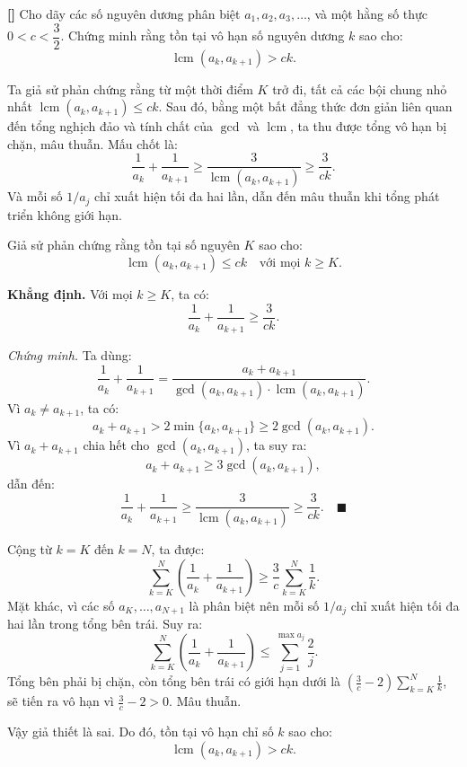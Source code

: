 \documentclass[../01-divisibility.tex]{subfiles}
\begin{document}
\begin{example*}\label{example:CHN-2015-TST1-D1-P2}\textbf{[]}
	Cho dãy các số nguyên dương phân biệt \( a_1, a_2, a_3, \ldots \), và một hằng số thực \( 0 < c < \dfrac{3}{2} \).  
	Chứng minh rằng tồn tại vô hạn số nguyên dương \( k \) sao cho:
	\[
		\operatorname{lcm}(a_k, a_{k+1}) > c k.
	\]
\end{example*}

\begin{story*}
	Ta giả sử phản chứng rằng từ một thời điểm \( K \) trở đi, tất cả các bội chung nhỏ nhất \( \operatorname{lcm}(a_k, a_{k+1}) \le ck \).
	Sau đó, bằng một bất đẳng thức đơn giản liên quan đến tổng nghịch đảo và tính chất của \( \gcd \) và \( \operatorname{lcm} \),
	ta thu được tổng vô hạn bị chặn, mâu thuẫn. Mấu chốt là:  
    \[
    	\frac{1}{a_k} + \frac{1}{a_{k+1}} \ge \frac{3}{\operatorname{lcm}(a_k, a_{k+1})} \ge \frac{3}{ck}.
    \]
    Và mỗi số \( 1/a_j \) chỉ xuất hiện tối đa hai lần, dẫn đến mâu thuẫn khi tổng phát triển không giới hạn.
\end{story*}

\bigbreak

\begin{soln}\footnotemark
	Giả sử phản chứng rằng tồn tại số nguyên \( K \) sao cho:
	\[
		\operatorname{lcm}(a_k, a_{k+1}) \le ck \quad \text{với mọi } k \ge K.
	\]
	
	\textbf{Khẳng định.} Với mọi \( k \ge K \), ta có:
	\[
		\frac1{a_k}+\frac1{a_{k+1}} \ge \frac3{ck}.
	\]
	
	\textit{Chứng minh.} Ta dùng:
	\[
		\frac1{a_k}+\frac1{a_{k+1}} = \frac{a_k + a_{k+1}}{\gcd(a_k, a_{k+1}) \cdot \operatorname{lcm}(a_k, a_{k+1})}.
	\]
	Vì \( a_k \ne a_{k+1} \), ta có:
	\[
		a_k + a_{k+1} > 2\min\{a_k, a_{k+1}\} \ge 2\gcd(a_k, a_{k+1}).
	\]
	Vì \( a_k + a_{k+1} \) chia hết cho \( \gcd(a_k, a_{k+1}) \), ta suy ra:
	\[
		a_k + a_{k+1} \ge 3\gcd(a_k, a_{k+1}),
	\]
	dẫn đến:
	\[
		\frac1{a_k}+\frac1{a_{k+1}} \ge \frac3{\operatorname{lcm}(a_k, a_{k+1})} \ge \frac3{ck}.
	\quad \blacksquare
	\]

	Cộng từ \( k = K \) đến \( k = N \), ta được:
	\[
		\sum_{k=K}^N \left( \frac1{a_k}+\frac1{a_{k+1}} \right) \ge \frac{3}{c} \sum_{k=K}^N \frac1{k}.
	\]
	Mặt khác, vì các số \( a_K, \ldots, a_{N+1} \) là phân biệt nên mỗi số \( 1/a_j \) chỉ xuất hiện tối đa hai lần trong tổng bên trái.  
	Suy ra:
	\[
		\sum_{k=K}^N \left( \frac1{a_k}+\frac1{a_{k+1}} \right) \le \sum_{j=1}^{\max a_j} \frac{2}{j}.
	\]
	Tổng bên phải bị chặn, còn tổng bên trái có giới hạn dưới là \( \left( \frac{3}{c} - 2 \right) \sum_{k=K}^N \frac1{k} \), sẽ tiến ra vô hạn vì \( \frac{3}{c} - 2 > 0 \).  
	Mâu thuẫn.

	Vậy giả thiết là sai. Do đó, tồn tại vô hạn chỉ số \( k \) sao cho:
	\[
		\operatorname{lcm}(a_k, a_{k+1}) > ck.
	\]
\end{soln}

\end{document}
